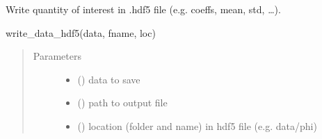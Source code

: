 \documentclass[letterpaper,10pt,english,openany,oneside]{sphinxmanual}
\begin{document}
\begin{fulllineitems}
\label{\detokenize{pygpc:pygpc.io.write_data_hdf5}}
Write quantity of interest in .hdf5 file (e.g. coeffs, mean, std, …).

write\_data\_hdf5(data, fname, loc)
\begin{quote}\begin{description}
\item[{Parameters}] \leavevmode\begin{itemize}
\item {} 
 () \textendash{} data to save

\item {} 
 () \textendash{} path to output file

\item {} 
 () \textendash{} location (folder and name) in hdf5 file (e.g. data/phi)

\end{itemize}

\end{description}\end{quote}

\end{fulllineitems}

\end{document}
